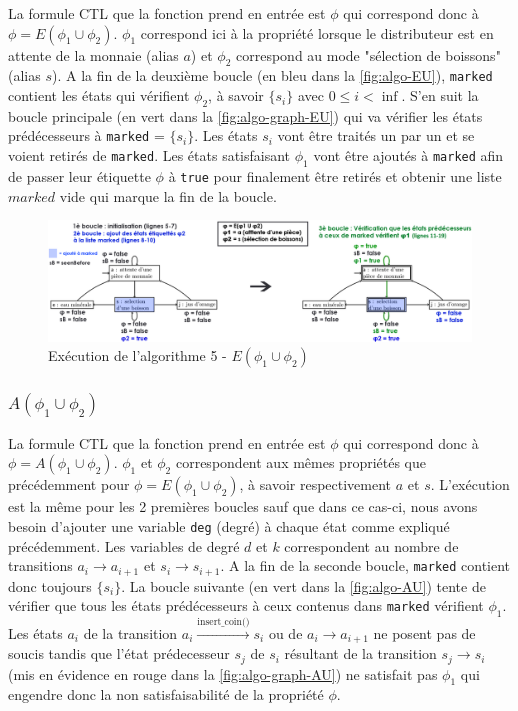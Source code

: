 \documentclass[runningheads,a4paper,10pt]{llncs}
\begin{document}
La formule CTL que la fonction prend en entrée est $\phi$ qui correspond donc à $\phi = E(\phi_{1} \cup \phi_{2})$. $\phi_{1}$ correspond ici à la propriété lorsque le distributeur est en attente de la monnaie (alias $a$) et $\phi_{2}$ correspond au mode "sélection de boissons" (alias $s$). A la fin de la deuxième boucle (en bleu dans la \autoref{fig:algo-EU}), \texttt{marked} contient les états qui vérifient $\phi_{2}$, à savoir $\{s_{i}\}$ avec $0 \le i < \inf$. S'en suit la boucle principale (en vert dans la \autoref{fig:algo-graph-EU}) qui va vérifier les états prédécesseurs à \texttt{marked} = $\{s_{i}\}$. Les états $s_{i}$ vont être traités un par un et se voient retirés de \texttt{marked}. Les états satisfaisant $\phi_{1}$ vont être ajoutés à \texttt{marked} afin de passer leur étiquette $\phi$ à \texttt{true} pour finalement être retirés et obtenir une liste $marked$ vide qui marque la fin de la boucle. 


\begin{figure}
  \centering
   \includegraphics[scale=0.38]{figures/algo-graph-EU.png}
   \caption[Caption for LOF]{Exécution de l'algorithme 5 - $E(\phi_{1} \cup \phi_{2})$}
   \label{fig:algo-graph-EU}
\end{figure} 


\subsubsection{$A(\phi_{1} \cup \phi_{2})$}

La formule CTL que la fonction prend en entrée est $\phi$ qui correspond donc à $\phi = A(\phi_{1} \cup \phi_{2})$. $\phi_{1}$ et $\phi_{2}$ correspondent aux mêmes propriétés que précédemment pour $\phi = E(\phi_{1} \cup \phi_{2})$, à savoir respectivement $a$ et $s$. L'exécution est la même pour les 2 premières boucles sauf que dans ce cas-ci, nous avons besoin d'ajouter une variable \texttt{deg} (degré) à chaque état comme expliqué précédemment. Les variables de degré $d$ et $k$ correspondent au nombre de transitions $a_{i} \longrightarrow a_{i+1}$ et $s_{i} \longrightarrow s_{i+1}$. A la fin de la seconde boucle, \texttt{marked} contient donc toujours $\{s_{i}\}$. La boucle suivante (en vert dans la \autoref{fig:algo-AU}) tente de vérifier que tous les états prédécesseurs à ceux contenus dans \texttt{marked} vérifient $\phi_{1}$. Les états $a_{i}$ de la transition $a_{i} \xrightarrow{\text{insert\_coin()}} s_{i}$ ou de $a_{i} \longrightarrow a_{i+1}$ ne posent pas de soucis tandis que l'état prédecesseur $s_{j}$ de $s_{i}$ résultant de la transition $s_{j} \longrightarrow s_{i}$ (mis en évidence en rouge dans la \autoref{fig:algo-graph-AU}) ne satisfait pas $\phi_{1}$ qui engendre donc la non satisfaisabilité de la propriété $\phi$. 
\end{document}
